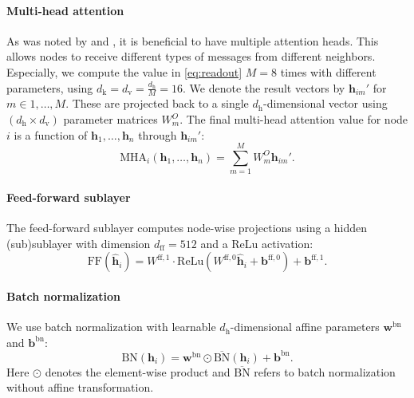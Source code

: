\paragraph{Multi-head attention}
As was noted by \citet{vaswani2017attention} and \citet{velickovic2018graph}, it is beneficial to have multiple attention heads. This allows nodes to receive different types of messages from different neighbors. Especially, we compute the value in \eqref{eq:readout} $M = 8$ times with different parameters, using $d_{\text{k}} = d_{\text{v}} = \frac{d_{\text{h}}}{M} = 16$. We denote the result vectors by $\mathbf{h}_{im}'$ for $m \in {1, \ldots, M}$. These are projected back to a single $d_{\text{h}}$-dimensional vector using $(d_{\text{h}} \times d_{\text{v}})$ parameter matrices $W_m^O$. The final multi-head attention value for node $i$ is a function of $\mathbf{h}_1, \ldots, \mathbf{h}_n$ through $\mathbf{h}_{im}'$:
\begin{equation}
\label{eq:MHA}
	\text{MHA}_i(\mathbf{h}_1, \ldots, \mathbf{h}_n) = \sum\limits_{m=1}^{M} W_m^O \mathbf{h}_{im}'.
\end{equation}

\paragraph{Feed-forward sublayer}
The feed-forward sublayer computes node-wise projections using a hidden (sub)sublayer with dimension $d_{\text{ff}} = 512$ and a ReLu activation:
\begin{equation}
\label{eq:ff_layer}
	\text{FF}(\hat{\mathbf{h}}_i) = W^{\text{ff},1} \cdot \text{ReLu}(W^{\text{ff},0} \hat{\mathbf{h}}_i + \bm{b}^{\text{ff},0}) + \bm{b}^{\text{ff},1}.
\end{equation}

\paragraph{Batch normalization}
We use batch normalization with learnable $d_{\text{h}}$-dimensional affine parameters $\bm{w}^{\text{bn}}$ and $\bm{b}^{\text{bn}}$:
\begin{equation}
\label{eq:bn_layer}
	\text{BN}(\mathbf{h}_i) = \bm{w}^{\text{bn}} \odot \overline{\text{BN}}(\mathbf{h}_i) + \bm{b}^{\text{bn}}.
\end{equation}
Here $\odot$ denotes the element-wise product and $\overline{\text{BN}}$ refers to batch normalization without affine transformation.
